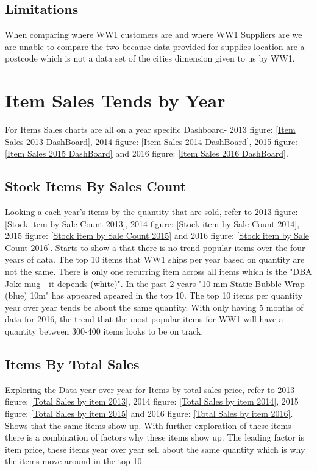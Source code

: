 \documentclass[12pt]{article}
\begin{document}
\subsection{Limitations}
\begin{flushleft}
    When comparing where WW1 customers are and where WW1 Suppliers are we are unable to compare the two because data provided for supplies location are a postcode which is not a data set of the cities dimension given to us by WW1.
\end{flushleft}


\section{Item Sales Tends by Year}
\begin{flushleft}
    For Items Sales charts are all on a year specific Dashboard- 2013 figure: \ref{Item Sales 2013 DashBoard}, 2014 figure: \ref{Item Sales 2014 DashBoard}, 2015 figure: \ref{Item Sales 2015 DashBoard} and 2016 figure: \ref{Item Sales 2016 DashBoard}.
\end{flushleft}

\subsection{Stock Items By Sales Count}

\begin{flushleft}
Looking a each year's items by the quantity that are sold, refer to 2013 figure: \ref{Stock item by Sale Count 2013}, 2014 figure: \ref{Stock item by Sale Count 2014}, 2015 figure: \ref{Stock item by Sale Count 2015} and 2016 figure: \ref{Stock item by Sale Count 2016}. Starts to show a that there is no trend popular items over the four years of data. The top 10 items that WW1 ships per year based on quantity are not the same. There is only one recurring item across all items which is the "DBA Joke mug - it depends (white)". In the past 2 years "10 mm Static Bubble Wrap (blue) 10m" has appeared apeared in the top 10. The top 10 items per quantity year over year tends be about the same quantity. With only having 5 months of data for 2016, the trend that the most popular items for WW1 will have a quantity between 300-400 items looks to be on track.
\end{flushleft}

\subsection{Items By Total Sales}
\begin{flushleft}
Exploring the Data year over year for Items by total sales price, refer to 2013 figure: \ref{Total Sales by item 2013}, 2014 figure: \ref{Total Sales by item 2014}, 2015 figure: \ref{Total Sales by item 2015} and 2016 figure: \ref{Total Sales by item 2016}. Shows that the same items show up. With further exploration of these items there is a combination of factors why these items show up. The leading factor is item price, these items year over year sell about the same quantity which is why the items move around in the top 10.
\end{flushleft}
\end{document}

